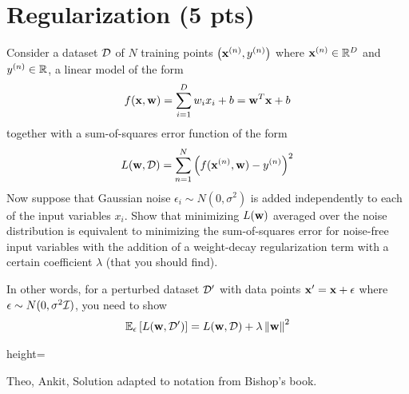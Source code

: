 \section{Regularization (5 pts)}

Consider a dataset ${\cal{D}}$ of $N$ training points $\left({\bf{x}}^{(n)}, y^{(n)}\right)$ where ${\bf{x}}^{(n)} \in {\mathbb{R}}^D$ and $y^{(n)} \in {\mathbb{R}}$, a linear model of the form
\begin{align}
f({\bf{x}}, {\bf{w}}) = \sum_{i=1}^D w_i x_i + b = {\bf{w}}^T {\bf{x}} + b
\end{align}
together with a sum-of-squares error function of the form
\begin{align}
L({\bf{w}}, {\cal{D}}) = \sum_{n=1}^N \left(f({\bf{x}}^{(n)}, {\bf{w}}) - y^{(n)}\right)^2
\end{align}
Now suppose that Gaussian noise $\epsilon_i \sim N(0, \sigma^2)$ is added independently to each of the input variables $x_i$. Show that minimizing $L({\bf{w}})$ averaged over the noise distribution is equivalent to minimizing the sum-of-squares error for noise-free input variables with the addition of a weight-decay regularization term with a certain coefficient $\lambda$ (that you should find). %

In other words, for a perturbed dataset ${\cal{D}}'$ with data points ${\bf{x}}' = {\bf{x}} + {\bf{\epsilon}}$ where ${\bf{\epsilon}} \sim N(0, \sigma^2 {\cal{I}})$, you need to show
\begin{align}
{\mathbb{E}}_{{\bf{\epsilon}}}\left[L({\bf{w}}, {\cal{D}}')\right] = L({\bf{w}}, {\cal{D}}) + \lambda \left\lVert {\bf{w}} \right\rVert^2
\end{align}

\pagebreak

\begin{soln}{height=\textheight}
\One
\end{soln}

\begin{qauthor}
Theo, Ankit, Solution adapted to notation from Bishop's book. 
\end{qauthor}


